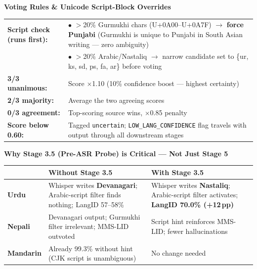 \documentclass[11pt,a4paper]{article}
\begin{document}
\vspace{6pt}

\begin{tcolorbox}[enhanced,colback=LPurple,colframe=Purple,arc=5pt,boxrule=1.5pt,
  left=9pt,right=9pt,top=7pt,bottom=7pt]
\textbf{\color{Purple}Voting Rules \& Unicode Script-Block Overrides}\\[4pt]
\begin{tabular}{@{}p{4cm}p{12cm}@{}}
\textbf{Script check (runs first):} &
$\bullet$ $>$20\% Gurmukhi chars (U+0A00--U+0A7F) $\to$ \textbf{force Punjabi} (Gurmukhi is unique to Punjabi in South Asian writing --- zero ambiguity)\\
& $\bullet$ $>$20\% Arabic/Nastaliq $\to$ narrow candidate set to \{ur, ks, sd, ps, fa, ar\} before voting\\[4pt]
\textbf{3/3 unanimous:} & Score $\times$1.10 (10\% confidence boost --- highest certainty)\\[2pt]
\textbf{2/3 majority:} & Average the two agreeing scores\\[2pt]
\textbf{0/3 agreement:} & Top-scoring source wins, $\times$0.85 penalty\\[4pt]
\textbf{Score below 0.60:} & Tagged \texttt{uncertain}; \texttt{LOW\_LANG\_CONFIDENCE} flag travels with output through all downstream stages\\
\end{tabular}
\end{tcolorbox}

\vspace{6pt}

\begin{tcolorbox}[enhanced,colback=LAmber,colframe=Amber,arc=5pt,boxrule=1.5pt,
  left=9pt,right=9pt,top=7pt,bottom=7pt]
\textbf{\color{Amber}Why Stage 3.5 (Pre-ASR Probe) is Critical --- Not Just Stage 5}\\[4pt]
\begin{tabular}{@{}p{2cm}p{6.5cm}p{6.5cm}@{}}
& \textbf{Without Stage 3.5} & \textbf{With Stage 3.5}\\
\midrule
\textbf{Urdu} & Whisper writes \textbf{Devanagari}; Arabic-script filter finds nothing; LangID 57--58\% & Whisper writes \textbf{Nastaliq}; Arabic-script filter activates; \textbf{LangID 70.0\% (+12\,pp)}\\[3pt]
\textbf{Nepali} & Devanagari output; Gurmukhi filter irrelevant; MMS-LID outvoted & Script hint reinforces MMS-LID; fewer hallucinations\\[3pt]
\textbf{Mandarin} & Already 99.3\% without hint (CJK script is unambiguous) & No change needed\\
\end{tabular}
\end{tcolorbox}
\end{document}

